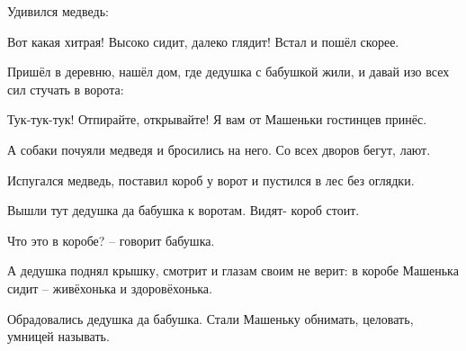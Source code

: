Удивился медведь:

\begin{dialogue}
    \item Вот какая хитрая! Высоко сидит, далеко глядит! Встал и пошёл скорее.
\end{dialogue}
Пришёл в деревню, нашёл дом, где дедушка с бабушкой жили, и давай изо всех сил стучать в ворота:
\begin{dialogue}
    \item Тук-тук-тук! Отпирайте, открывайте! Я вам от Машеньки гостинцев принёс.
\end{dialogue}
А собаки почуяли медведя и бросились на него. Со всех дворов бегут, лают.

Испугался медведь, поставил короб у ворот и пустился в лес без оглядки.

Вышли тут дедушка да бабушка к воротам. Видят- короб стоит.
\begin{dialogue}
    \item Что это в коробе? -- говорит бабушка.
\end{dialogue}
А дедушка поднял крышку, смотрит и глазам своим не верит: в коробе Машенька сидит -- живёхонька и здоровёхонька.

Обрадовались дедушка да бабушка. Стали Машеньку обнимать, целовать, умницей называть.
